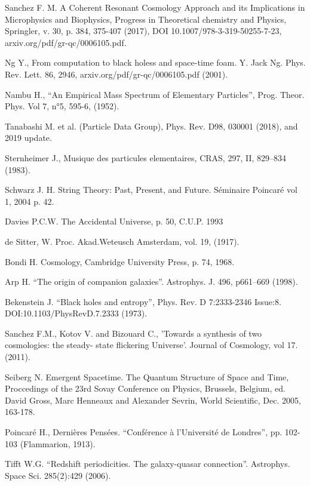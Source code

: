 \documentclass[a4paper,9pt]{article}
\begin{document}
\begin{thebibliography}{99}
 Sanchez F. M. A Coherent Resonant Cosmology Approach and its Implications in Microphysics and Biophysics, Progress in Theoretical chemistry and Physics, Springler, v. 30, p. 384, 375-407 (2017), DOI 10.1007/978-3-319-50255-7-23, arxiv.org/pdf/gr-qc/0006105.pdf.

 Ng Y., From computation to black holess and space-time foam. Y. Jack Ng. Phys. Rev. Lett. 86, 2946, arxiv.org/pdf/gr-qc/0006105.pdf (2001).

 Nambu H., “An Empirical Mass Spectrum of Elementary Particles”, Prog. Theor. Phys. Vol 7, n°5, 595-6, (1952).

 Tanabashi M. et al. (Particle Data Group), Phys. Rev. D98, 030001 (2018), and 2019 update.

 Sternheimer J., Musique des particules elementaires, CRAS, 297, II, 829--834 (1983).

 Schwarz J. H. String Theory: Past, Present, and Future. Séminaire Poincaré vol 1, 2004 p. 42.

 Davies P.C.W. The Accidental Universe, p. 50, C.U.P. 1993

 de Sitter, W. Proc. Akad.Weteusch Amsterdam, vol. 19, (1917).

   Bondi H. Cosmology, Cambridge University Press, p. 74, 1968.

 Arp H. ``The origin of companion galaxies''. Astrophys. J. 496, p661--669 (1998).

 Bekenstein J. ``Black holes and entropy'', Phys. Rev. D 7:2333-2346 Issue:8. DOI:10.1103/PhysRevD.7.2333 (1973).

 Sanchez F.M., Kotov V. and Bizouard C., 'Towards a synthesis of two cosmologies: the steady- state flickering Universe'. Journal of Cosmology, vol 17. (2011).

 Seiberg N. Emergent Spacetime. The Quantum Structure of Space and Time, Proccedings of the 23rd Sovay Conference on Physics, Brussels, Belgium, ed. David Gross, Marc Henneaux and Alexander Sevrin, World Scientific, Dec. 2005, 163-178.

 Poincaré H., Dernières Pensées. “Conférence à l’Université de Londres”, pp. 102-103 (Flammarion, 1913).

 Tifft W.G. ``Redshift periodicities. The galaxy-quasar connection''. Astrophys. Space Sci. 285(2):429 (2006).


\end{thebibliography}
\end{document}
